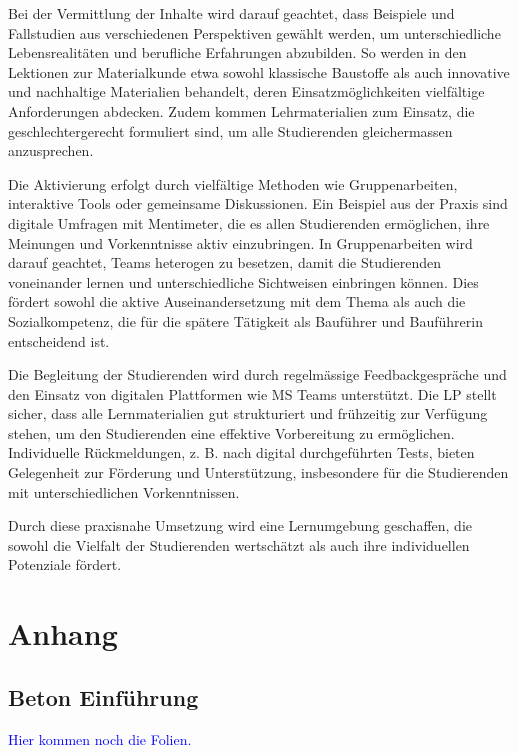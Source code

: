 \documentclass[
11pt,
captions=tableheading,
smallheadings,
headsepline,
footsepline, 
parskip=half-,
]{scrartcl}
\begin{document}
Bei der Vermittlung der Inhalte wird darauf geachtet, dass Beispiele und Fallstudien aus verschiedenen Perspektiven gewählt werden, um unterschiedliche Lebensrealitäten und berufliche Erfahrungen abzubilden. So werden in den Lektionen zur Materialkunde etwa sowohl klassische Baustoffe als auch innovative und nachhaltige Materialien behandelt, deren Einsatzmöglichkeiten vielfältige Anforderungen abdecken. Zudem kommen Lehrmaterialien zum Einsatz, die geschlechtergerecht formuliert sind, um alle Studierenden gleichermassen anzusprechen.

Die Aktivierung erfolgt durch vielfältige Methoden wie Gruppenarbeiten, interaktive Tools oder gemeinsame Diskussionen. Ein Beispiel aus der Praxis sind digitale Umfragen mit Mentimeter, die es allen Studierenden ermöglichen, ihre Meinungen und Vorkenntnisse aktiv einzubringen. In Gruppenarbeiten wird darauf geachtet, Teams heterogen zu besetzen, damit die Studierenden voneinander lernen und unterschiedliche Sichtweisen einbringen können. Dies fördert sowohl die aktive Auseinandersetzung mit dem Thema als auch die Sozialkompetenz, die für die spätere Tätigkeit als Bauführer und Bauführerin entscheidend ist.

Die Begleitung der Studierenden wird durch regelmässige Feedbackgespräche und den Einsatz von digitalen Plattformen wie MS Teams unterstützt. Die LP stellt sicher, dass alle Lernmaterialien gut strukturiert und frühzeitig zur Verfügung stehen, um den Studierenden eine effektive Vorbereitung zu ermöglichen. Individuelle Rückmeldungen, z. B. nach digital durchgeführten Tests, bieten Gelegenheit zur Förderung und Unterstützung, insbesondere für die Studierenden mit unterschiedlichen Vorkenntnissen. 

Durch diese praxisnahe Umsetzung wird eine Lernumgebung geschaffen, die sowohl die Vielfalt der Studierenden wertschätzt als auch ihre individuellen Potenziale fördert.

\clearpage




\clearpage
{}

\printbibliography

\clearpage
\appendix
\section{Anhang}
\subsection{Beton Einführung}
\label{ssec:Beton_Einführung_Folien}
\textcolor{blue}{Hier kommen noch die Folien.}
%
\end{document}
